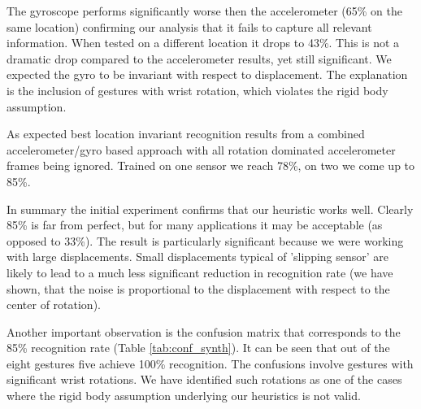 The gyroscope performs
significantly worse then the accelerometer (65\% on the same location) confirming our
analysis that it fails to capture all relevant information.   When
tested on a different location it  drops to 43\%. 
This is not a dramatic drop compared to the accelerometer results, yet
still significant. We expected the gyro to be invariant with respect
to displacement. The explanation is the inclusion of gestures with wrist
rotation, which violates the rigid body assumption.

As expected best  location invariant recognition results
from a combined accelerometer/gyro based approach with all rotation
dominated accelerometer frames being ignored. Trained on one sensor we
reach 78\%,  on two we come up to 85\%.

In summary the initial experiment  confirms that our
heuristic works well. Clearly 85\% is far from perfect, but for many
applications it may be acceptable (as opposed to 33\%).  The result is
particularly significant because we were working with large
displacements. Small displacements typical of 'slipping sensor' are
likely to lead to a much less significant reduction in recognition
rate (we have shown, that the noise is proportional to the
displacement with respect to the center of rotation). 

Another important observation is the confusion matrix that
corresponds to the 85\%  recognition rate (Table
\ref{tab:conf_synth}).
It can be seen that out of the eight gestures five achieve 100\% recognition.
The confusions involve gestures with significant wrist rotations. We
have identified such rotations
 as one of the cases where the rigid body assumption
underlying our heuristics is not valid. 

